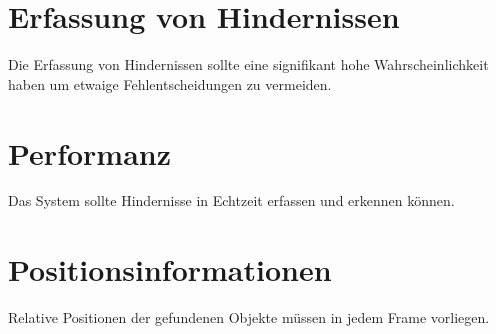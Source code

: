 \section{Erfassung von Hindernissen}
\label{sec:erfassung_von_hindernissen}

	\begin{anforderung}
	\label{req:erfassung_von_hindernissen}
		Die Erfassung von Hindernissen sollte eine signifikant hohe Wahrscheinlichkeit haben um etwaige Fehlentscheidungen zu vermeiden.
	\end{anforderung}

\section{Performanz}
\label{sec:performanz}

	\begin{anforderung}
	\label{req:performanz}
		Das System sollte Hindernisse in Echtzeit erfassen und erkennen können.
	\end{anforderung}

\section{Positionsinformationen}
\label{sec:positionsinformationen}

	\begin{anforderung}
	\label{req:positionsinformationen}
		Relative Positionen der gefundenen Objekte müssen in jedem Frame vorliegen.
	\end{anforderung}
